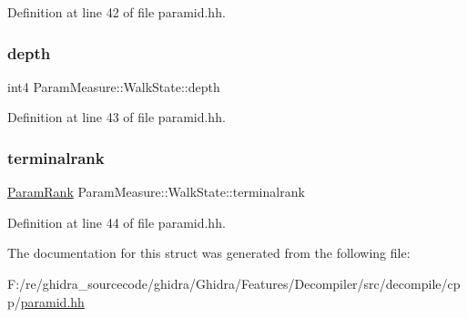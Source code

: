Definition at line 42 of file paramid.\+hh.

\mbox{\label{struct_param_measure_1_1_walk_state_a23ddda18c4239c2fb2b0d5d7391b72df}} 
\subsubsection{\texorpdfstring{depth}{depth}}
{\footnotesize\ttfamily int4 Param\+Measure\+::\+Walk\+State\+::depth}



Definition at line 43 of file paramid.\+hh.

\mbox{\label{struct_param_measure_1_1_walk_state_ade3ba76348c31180fbf15b61e2a3ccc4}} 
\subsubsection{\texorpdfstring{terminalrank}{terminalrank}}
{\footnotesize\ttfamily \mbox{\hyperlink{class_param_measure_a8393fe6e19e1e4e80943a9b3e3f717c6}{Param\+Rank}} Param\+Measure\+::\+Walk\+State\+::terminalrank}



Definition at line 44 of file paramid.\+hh.



The documentation for this struct was generated from the following file\+:\begin{DoxyCompactItemize}
\item 
F\+:/re/ghidra\+\_\+sourcecode/ghidra/\+Ghidra/\+Features/\+Decompiler/src/decompile/cpp/\mbox{\hyperlink{paramid_8hh}{paramid.\+hh}}\end{DoxyCompactItemize}
